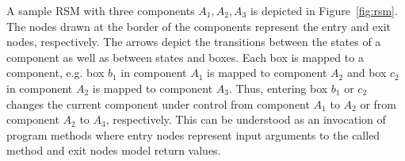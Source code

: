 \documentclass[a4paper, 12pt, twoside]{report}
\begin{document}
	A sample RSM with three components $A_1, A_2, A_3$ is depicted in Figure~\ref{fig:rsm}. The nodes drawn at the border of the components represent the entry and exit nodes, respectively. The arrows depict the transitions between the states of a component as well as between states and boxes. Each box is mapped to a component, e.g. box $b_1$ in component $A_1$ is mapped to component $A_2$ and box $c_2$ in component $A_2$ is mapped to component $A_3$. Thus, entering box $b_1$ or $c_2$ changes the current component under control from component $A_1$ to $A_2$ or from component $A_2$ to $A_3$, respectively. This can be understood as an invocation of program methods where entry nodes represent input arguments to the called method and exit nodes model return values. \\
	
\end{document}
